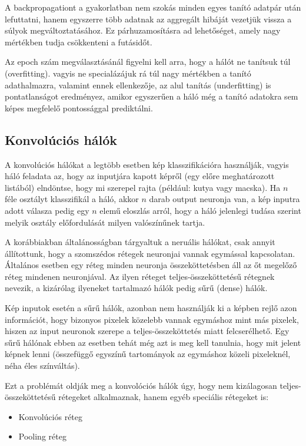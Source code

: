 \documentclass[12pt]{article}
\begin{document}
A backpropagationt a gyakorlatban nem szokás minden egyes tanító adatpár után lefuttatni, hanem egyszerre több adatnak az aggregált hibáját vezetjük vissza a súlyok megváltoztatásához. Ez párhuzamosításra ad lehetőséget, amely nagy mértékben tudja csökkenteni a futásidőt.

Az epoch szám megválasztásánál figyelni kell arra, hogy a hálót ne tanítsuk túl (overfitting). vagyis ne specialázájuk rá túl nagy mértékben a tanító adathalmazra, valamint ennek ellenkezője, az alul tanítás (underfitting) is pontatlanságot eredményez, amikor egyszerűen a háló még a tanító adatokra sem képes megfelelő pontossággal prediktálni.

\subsection{Konvolúciós hálók}

A konvolúciós hálókat a legtöbb esetben kép klasszifikációra használják, vagyis háló feladata az, hogy az inputjára kapott képről (egy előre meghatározott listából) elndöntse, hogy  mi szerepel rajta (például: kutya vagy macska). Ha $n$ féle osztályt klasszifikál a háló, akkor $n$ darab output neuronja van, a kép inputra adott válasza pedig egy $n$ elemű eloszlás arról, hogy a háló jelenlegi tudása szerint melyik osztály előfordulását milyen valószínűnek tartja.

A korábbiakban általánosságban tárgyaltuk a neruális hálókat, csak annyit állítottunk, hogy a szomszédos rétegek neuronjai vannak egymással kapcsolatan. Általános esetben egy réteg minden neuronja összeköttetésben áll az őt megelőző réteg mindenen neuronjával. Az ilyen réteget teljes-összeköttetésű rétegnek nevezik, a kizárólag ilyeneket tartalmazó hálók pedig sűrű (dense) hálók.

Kép inputok esetén a sűrű hálók, azonban nem használják ki a képben rejlő azon információt, hogy bizonyos pixelek közelebb vannak egymáshoz mint más pixelek, hiszen az input neuronok szerepe a teljes-összeköttetés miatt felcserélhető. Egy sűrű hálónak ebben az esetben tehát még azt is meg kell tanulnia, hogy mit jelent képnek lenni (összefüggő egyszínű tartományok az egymáshoz közeli pixeleknél, néha éles színváltás).

Ezt a problémát oldják meg a konvolóciós hálók úgy, hogy nem kizálagosan teljes-összeköttetésű rétegeket alkalmaznak, hanem egyéb speciális rétegeket is:

\begin{itemize}
  \item Konvolúciós réteg
  \item Pooling réteg
\end{itemize}
\end{document}
